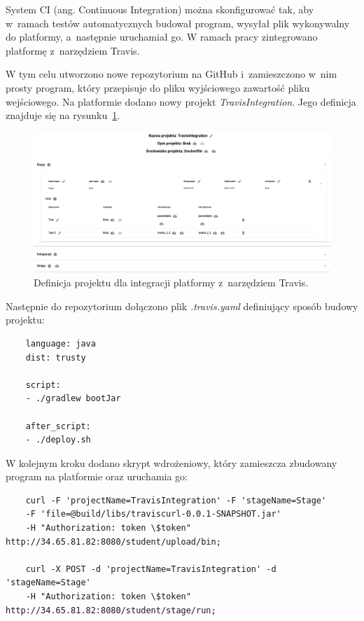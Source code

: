 System CI (ang. Continuous Integration) można skonfigurować tak, aby w~ramach testów automatycznych budował program, wysyłał plik wykonywalny do platformy, a~następnie uruchamiał go.
W ramach pracy zintegrowano platformę z~narzędziem Travis.

W tym celu utworzono nowe repozytorium na GitHub i~zamieszczono w~nim prosty program, który przepisuje do pliku wyjściowego zawartość pliku wejściowego.
Na platformie dodano nowy projekt \textit{TravisIntegration}.
Jego definicja znajduje się na rysunku~\ref{fig:travis_integration}.

\begin{figure}[h]
    \centering
    \includegraphics[width = 16cm]{chapter05/travis_integration.png}
    \caption{Definicja projektu dla integracji platformy z~narzędziem Travis.}
    \label{fig:travis_integration}
\end{figure}

Następnie do repozytorium dołączono plik \textit{.travis.yaml} definiujący sposób budowy projektu:

{\selectfont
\tiny
\begin{lstlisting}
    language: java
    dist: trusty

    script:
    - ./gradlew bootJar

    after_script:
    - ./deploy.sh
\end{lstlisting}
}

W kolejnym kroku dodano skrypt wdrożeniowy, który zamieszcza zbudowany program na platformie oraz uruchamia go:

{\selectfont
\tiny
\begin{lstlisting}
    curl -F 'projectName=TravisIntegration' -F 'stageName=Stage'
    -F 'file=@build/libs/traviscurl-0.0.1-SNAPSHOT.jar'
    -H "Authorization: token \$token" http://34.65.81.82:8080/student/upload/bin;

    curl -X POST -d 'projectName=TravisIntegration' -d 'stageName=Stage'
    -H "Authorization: token \$token" http://34.65.81.82:8080/student/stage/run;
\end{lstlisting}
}

